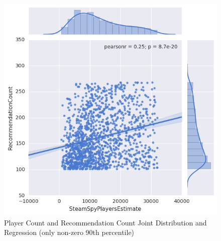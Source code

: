 \documentclass[letterpaper,10pt,twocolumn]{article}
\begin{document}
\begin{figure}[p]
    \caption{Player Count and Recommendation Count Joint Distribution and Regression (only non-zero 90th percentile) \label{fig:players-recommendations-jointwithreg}}
    \includegraphics[width=\textwidth,keepaspectratio]{player-count-recommends-jointwithreg}
\end{figure}

\end{document}
